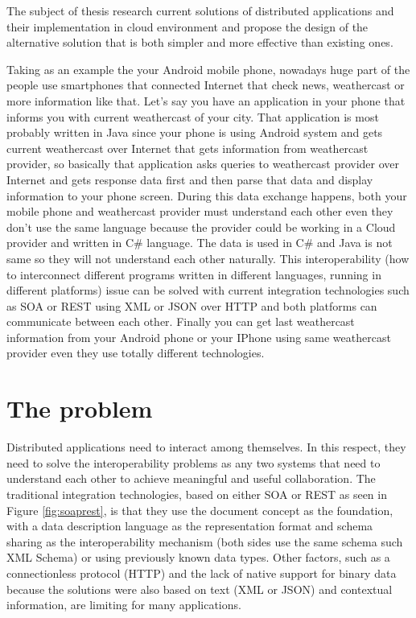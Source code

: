 The subject of thesis research current solutions of distributed applications and their implementation in cloud environment and propose the design of the alternative solution that is both simpler and more effective than existing ones.

Taking as an example the your Android mobile phone, nowadays huge part of the people use smartphones that connected Internet that check news, weathercast or more information like that. Let’s say you have an application in your phone that informs you with current weathercast of your city. That application is most probably written in Java since your phone is using Android system and gets current weathercast over Internet that gets information from weathercast provider, so basically that application asks queries to weathercast provider over Internet and gets response data first and then parse that data and display information to your phone screen. During this data exchange happens, both your mobile phone and weathercast provider must understand each other even they don’t use the same language because the provider could be working in a Cloud provider and written in C\# language.  The data is used in C\# and Java is not same so they will not understand each other naturally. This interoperability (how to interconnect different programs written in different languages, running in different platforms) issue can be solved with current integration technologies such as SOA or REST using XML or JSON over HTTP and both platforms can communicate between each other. Finally you can get last weathercast information from your Android phone or your IPhone using same weathercast provider even they use totally different technologies.

\section{The problem}
\label{section:problem}

Distributed applications need to interact among themselves. In this respect, they need to solve the interoperability problems as any two systems that need to understand each other to achieve meaningful and useful collaboration. The traditional integration technologies, based on either SOA or REST as seen in Figure \ref{fig:soaprest}, is that they use the document concept as the foundation, with a data description language as the representation format and schema sharing as the interoperability mechanism (both sides use the same schema such XML Schema) or using previously known data types. Other factors, such as a connectionless protocol (HTTP) and the lack of native support for binary data because the solutions were also based on text (XML or JSON) and contextual information, are limiting for many applications.

